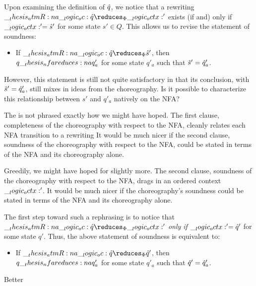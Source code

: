 Upon examining the definition of $\hat{q}$, we notice that a rewriting $\atmR{a} \oc \defp{q} \reduces_{\orsig} \octx'$ exists (if and) only if $\__logic_octx:' = \hat{s}'$ for some state $s' \in Q$.
This allows us to revise the statement of soundness: 
\begin{itemize}
\item
  If $\atmR{a} \oc \defp{q} \reduces_{\orsig} \defp{s}'$, then $q \nfareduces[a] q'_a$ for some state $q'_a$ such that $\hat{s}' = \hat{q}'_a$.
\end{itemize}
However, this statement is still not quite satisfactory in that its conclusion, with $\hat{s}' = \hat{q}'_a$, still mixes in ideas from the choreography.
Is it possible to characterize this relationship between $s'$ and $q'_a$ natively on the \ac{NFA}?



The  is not phrased exactly how we might have hoped.
The first clause, completeness of the choreography with respect to the \ac{NFA}, cleanly relates each \ac{NFA} transition to a rewriting
It would be much nicer if the second clause, soundness of the choreography with respect to the \ac{NFA}, could be stated in terms of the \ac{NFA} and its choreography alone.

Greedily, we might have hoped for slightly more.
The second clause, soundness of the choreography with respect to the \ac{NFA}, drags in an ordered context $\__logic_octx:'$.
It would be much nicer if the choreography's soundness could be stated in terms of the \ac{NFA} and its choreography alone.

The first step toward such a rephrasing is to notice that $\atmR{a} \oc \defp{q} \reduces_{\orsig} \octx'$ \emph{only if} $\__logic_octx:' = \hat{q}'$ for some state $q'$.
Thus, the above statement of soundness is equivalent to:
\begin{itemize}
\item
  If $\atmR{a} \oc \defp{q} \reduces_{\orsig} \defp{q}'$, then $q \nfareduces[a] q'_a$ for some state $q'_a$ such that $\hat{q}' = \hat{q}'_a$.
\end{itemize}
Better


